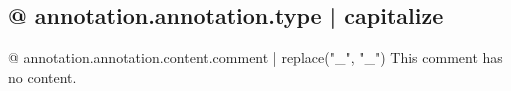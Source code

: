 \subsection{{@ annotation.annotation.type | capitalize }}

{@ annotation.annotation.content.comment | replace("_", "\_") }
This comment has no content.
